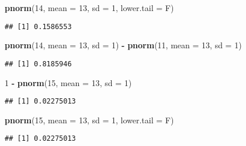 \documentclass[]{article}
\newenvironment{Shaded}{\begin{snugshade}}{\end{snugshade}}
\newcommand{\DataTypeTok}[1]{\textcolor[rgb]{0.13,0.29,0.53}{#1}}
\newcommand{\DecValTok}[1]{\textcolor[rgb]{0.00,0.00,0.81}{#1}}
\newcommand{\KeywordTok}[1]{\textcolor[rgb]{0.13,0.29,0.53}{\textbf{#1}}}
\newcommand{\NormalTok}[1]{#1}
\newcommand{\OperatorTok}[1]{\textcolor[rgb]{0.81,0.36,0.00}{\textbf{#1}}}
\newcommand{\StringTok}[1]{\textcolor[rgb]{0.31,0.60,0.02}{#1}}
\begin{document}
\begin{Shaded}
\begin{Highlighting}[]
\KeywordTok{pnorm}\NormalTok{(}\DecValTok{14}\NormalTok{, }\DataTypeTok{mean =} \DecValTok{13}\NormalTok{, }\DataTypeTok{sd =} \DecValTok{1}\NormalTok{, }\DataTypeTok{lower.tail =}\NormalTok{ F)}
\end{Highlighting}
\end{Shaded}

\begin{verbatim}
## [1] 0.1586553
\end{verbatim}

\begin{Shaded}
\begin{Highlighting}[]
\KeywordTok{pnorm}\NormalTok{(}\DecValTok{14}\NormalTok{, }\DataTypeTok{mean =} \DecValTok{13}\NormalTok{, }\DataTypeTok{sd =} \DecValTok{1}\NormalTok{) }\OperatorTok{-}\StringTok{ }\KeywordTok{pnorm}\NormalTok{(}\DecValTok{11}\NormalTok{, }\DataTypeTok{mean =} \DecValTok{13}\NormalTok{, }\DataTypeTok{sd =} \DecValTok{1}\NormalTok{)}
\end{Highlighting}
\end{Shaded}

\begin{verbatim}
## [1] 0.8185946
\end{verbatim}

\begin{Shaded}
\begin{Highlighting}[]
\DecValTok{1} \OperatorTok{-}\StringTok{ }\KeywordTok{pnorm}\NormalTok{(}\DecValTok{15}\NormalTok{, }\DataTypeTok{mean =} \DecValTok{13}\NormalTok{, }\DataTypeTok{sd =} \DecValTok{1}\NormalTok{)}
\end{Highlighting}
\end{Shaded}

\begin{verbatim}
## [1] 0.02275013
\end{verbatim}

\begin{Shaded}
\begin{Highlighting}[]
\KeywordTok{pnorm}\NormalTok{(}\DecValTok{15}\NormalTok{, }\DataTypeTok{mean =} \DecValTok{13}\NormalTok{, }\DataTypeTok{sd =} \DecValTok{1}\NormalTok{, }\DataTypeTok{lower.tail =}\NormalTok{ F)}
\end{Highlighting}
\end{Shaded}

\begin{verbatim}
## [1] 0.02275013
\end{verbatim}
\end{document}
